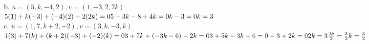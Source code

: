 \documentclass[11pt]{article}
\begin{document}
b. $u=(5,k,-4,2),v=(1,-3,2,2k)$ \\[5pt]

$
5(1)+k(-3)+(-4)(2)+2(2k) = 0 \\
5-3k-8+4k = 0 \\
k-3 = 0 \\
k = 3 \\
$ \\[5pt]

c. $u=(1,7,k+2,-2),v=(3,k,-3,k)$ \\[5pt]

$
1(3)+7(k)+(k+2)(-3)+(-2)(k) = 0 \\
3+7k+(-3k-6)-2k = 0 \\
3+5k-3k-6 = 0 \\
-3+2k = 0 \\
2k = 3 \\
\frac{2k}{2} = \frac{3}{2} \\
k = \frac{3}{2}
$ \\[5pt]
\end{document}
